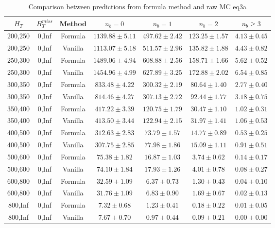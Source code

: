 \begin{longtable}{ | c | c | c | c | c | c | c | }
\caption{Comparison between predictions from formula method and raw MC eq3a} \label{tab:eq3a} \\    \hline 
$H_{T}$ & $H_{T}^{miss}$ & Method & $n_{b} = 0$ & $n_{b} = 1$ & $n_{b} = 2$ & $n_{b} \ge 3$ \\ \hline200,250 & 0,Inf & Formula  & $  1139.88 \pm  5.11 $ & $   497.62 \pm  2.42 $ & $   123.25 \pm  1.57 $ & $     4.13 \pm  0.45 $  \\  
200,250 & 0,Inf & Vanilla  & $  1113.07 \pm  5.18 $ & $   511.57 \pm  2.96 $ & $   135.82 \pm  1.88 $ & $     4.43 \pm  0.82 $  \\ \hline 
250,300 & 0,Inf & Formula  & $  1489.06 \pm  4.94 $ & $   608.88 \pm  2.56 $ & $   158.71 \pm  1.66 $ & $     5.62 \pm  0.52 $  \\  
250,300 & 0,Inf & Vanilla  & $  1454.96 \pm  4.99 $ & $   627.89 \pm  3.25 $ & $   172.88 \pm  2.02 $ & $     6.54 \pm  0.85 $  \\ \hline 
300,350 & 0,Inf & Formula  & $   833.48 \pm  4.22 $ & $   300.32 \pm  2.19 $ & $    80.64 \pm  1.40 $ & $     2.77 \pm  0.40 $  \\  
300,350 & 0,Inf & Vanilla  & $   814.46 \pm  4.27 $ & $   307.13 \pm  2.72 $ & $    92.44 \pm  1.77 $ & $     3.18 \pm  0.75 $  \\ \hline 
350,400 & 0,Inf & Formula  & $   417.22 \pm  3.39 $ & $   120.75 \pm  1.79 $ & $    30.47 \pm  1.10 $ & $     1.02 \pm  0.31 $  \\  
350,400 & 0,Inf & Vanilla  & $   413.50 \pm  3.44 $ & $   122.94 \pm  2.15 $ & $    31.97 \pm  1.41 $ & $     1.06 \pm  0.53 $  \\ \hline 
400,500 & 0,Inf & Formula  & $   312.63 \pm  2.83 $ & $    73.79 \pm  1.57 $ & $    14.77 \pm  0.89 $ & $     0.53 \pm  0.25 $  \\  
400,500 & 0,Inf & Vanilla  & $   307.75 \pm  2.85 $ & $    77.98 \pm  1.86 $ & $    15.09 \pm  1.11 $ & $     0.91 \pm  0.51 $  \\ \hline 
500,600 & 0,Inf & Formula  & $    75.38 \pm  1.82 $ & $    16.87 \pm  1.03 $ & $     3.74 \pm  0.62 $ & $     0.14 \pm  0.17 $  \\  
500,600 & 0,Inf & Vanilla  & $    74.10 \pm  1.84 $ & $    17.93 \pm  1.26 $ & $     4.01 \pm  0.78 $ & $     0.08 \pm  0.27 $  \\ \hline 
600,800 & 0,Inf & Formula  & $    32.59 \pm  1.09 $ & $     6.37 \pm  0.73 $ & $     1.30 \pm  0.43 $ & $     0.04 \pm  0.10 $  \\  
600,800 & 0,Inf & Vanilla  & $    31.76 \pm  1.09 $ & $     6.83 \pm  0.90 $ & $     1.69 \pm  0.67 $ & $     0.02 \pm  0.13 $  \\ \hline 
800,Inf & 0,Inf & Formula  & $     7.32 \pm  0.68 $ & $     1.23 \pm  0.41 $ & $     0.18 \pm  0.22 $ & $     0.01 \pm  0.05 $  \\  
800,Inf & 0,Inf & Vanilla  & $     7.67 \pm  0.70 $ & $     0.97 \pm  0.44 $ & $     0.09 \pm  0.21 $ & $     0.00 \pm  0.00 $  \\ \hline 
    \hline 
    \hline 
\end{longtable}
